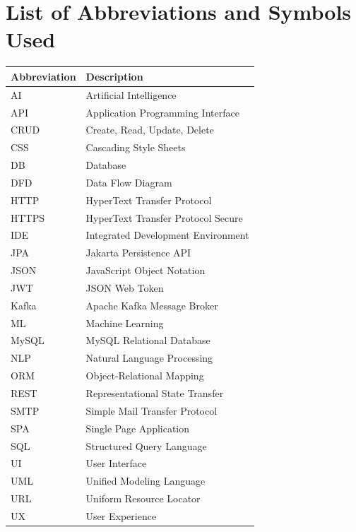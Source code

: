 \documentclass[12pt, a4paper]{report}
\begin{document}
\clearpage

\tableofcontents
\clearpage

\listoffigures
{}
\clearpage


\chapter*{List of Abbreviations and Symbols Used}

\begin{tabular}{@{} p{3cm} p{10cm} @{}} %
    \toprule
    \textbf{Abbreviation} & \textbf{Description} \\
    \midrule
    AI     & Artificial Intelligence \\
    API    & Application Programming Interface \\
    CRUD   & Create, Read, Update, Delete \\
    CSS    & Cascading Style Sheets \\
    DB     & Database \\
    DFD    & Data Flow Diagram \\
    HTTP   & HyperText Transfer Protocol \\
    HTTPS  & HyperText Transfer Protocol Secure \\
    IDE    & Integrated Development Environment \\
    JPA    & Jakarta Persistence API \\
    JSON   & JavaScript Object Notation \\
    JWT    & JSON Web Token \\
    Kafka  & Apache Kafka Message Broker \\
    ML     & Machine Learning \\
    MySQL  & MySQL Relational Database \\
    NLP    & Natural Language Processing \\
    ORM    & Object-Relational Mapping \\
    REST   & Representational State Transfer \\
    SMTP   & Simple Mail Transfer Protocol \\
    SPA    & Single Page Application \\
    SQL    & Structured Query Language \\
    UI     & User Interface \\
    UML    & Unified Modeling Language \\
    URL    & Uniform Resource Locator \\
    UX     & User Experience \\
    \bottomrule
\end{tabular}
\clearpage
\end{document}
